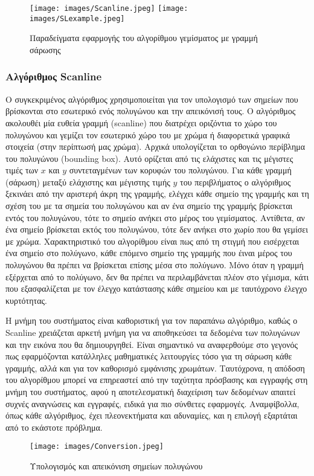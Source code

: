 \vspace{3em}
\begin{figure}[h]
\centering
\texttt{[image: images/Scanline.jpeg]}
\texttt{[image: images/SLexample.jpeg]}
\caption{Παραδείγματα εφαρμογής του αλγορίθμου γεμίσματος με γραμμή σάρωσης}
\end{figure}

\subsubsection{Αλγόριθμος \textlatin{Scanline}}

Ο συγκεκριμένος αλγόριθμος χρησιμοποιείται για τον υπολογισμό των σημείων που βρίσκονται στο εσωτερικό ενός πολυγώνου και την απεικόνισή τους. Ο αλγόριθμος ακολουθέι μία ευθεία γραμμή \textlatin{(scanline)} που διατρέχει οριζόντια το χώρο του πολυγώνου και γεμίζει τον εσωτερικό χώρο του με χρώμα ή διαφορετικά γραφικά στοιχεία (στην περίπτωσή μας χρώμα). Αρχικά υπολογίζεται το ορθογώνιο περίβλημα του πολυγώνου \textlatin{(bounding box)}. Αυτό ορίζεται από τις ελάχιστες και τις μέγιστες τιμές των $x$ και $y$ συντεταγμένων των κορυφών του πολυγώνου. Για κάθε γραμμή (σάρωση) μεταξύ ελάχιστης και μέγιστης τιμής $y$ του περιβλήματος ο αλγόριθμος ξεκινάει από την αριστερή άκρη της γραμμής, ελέγχει κάθε σημείο της γραμμής και τη σχέση του με τα σημεία του πολυγώνου και αν ένα σημείο της γραμμής βρίσκεται εντός του πολυγώνου, τότε το σημείο ανήκει στο μέρος του γεμίσματος. Αντίθετα, αν ένα σημείο βρίσκεται εκτός του πολυγώνου, τότε δεν ανήκει στο χωρίο που θα γεμίσει με χρώμα. Χαρακτηριστικό του αλγορίθμου είναι πως από τη στιγμή που εισέρχεται ένα σημείο στο πολύγωνο, κάθε επόμενο σημείο της γραμμής που έιναι μέρος του πολυγώνου θα πρέπει να βρίσκεται επίσης μέσα στο πολύγωνο. Μόνο όταν η γραμμή εξέρχεται από το πολύγωνο, δεν θα πρέπει να περιλαμβάνεται πλέον στο γέμισμα, κάτι που εξασφαλίζεται με τον έλεγχο κατάστασης κάθε σημείου και με ταυτόχρονο έλεγχο κυρτότητας. 
\par

Η μνήμη του συστήματος είναι καθοριστική για τον παραπάνω αλγόριθμο, καθώς ο \textlatin{Scanline} χρειάζεται αρκετή μνήμη για να αποθηκεύσει τα δεδομένα των πολυγώνων και την εικόνα που θα δημιουργηθεί. Είναι σημαντικό να αναφερθούμε στο γεγονός πως εφαρμόζονται κατάλληλες μαθηματικές λειτουργίες τόσο για τη σάρωση κάθε γραμμής, αλλά και για τον καθορισμό εμφάνισης χρωμάτων. Ταυτόχρονα, η απόδοση του αλγορίθμου μπορεί να επηρεαστεί από την ταχύτητα πρόσβασης και εγγραφής στη μνήμη του συστήματος, αφού η αποτελεσματική διαχείριση των δεδομένων απαιτεί συχνές αναγνώσεις και εγγραφές, ειδικά για πιο σύνθετες εφαρμογές. Αναμφίβολλα, όπως κάθε αλγόριθμος, έχει πλεονεκτήματα και αδυναμίες, και η επιλογή εξαρτάται από το εκάστοτε πρόβλημα.

\vspace{3em}
\begin{figure}[h]
\centering
\texttt{[image: images/Conversion.jpeg]}
\caption{Υπολογισμός και απεικόνιση σημείων πολυγώνου}
\end{figure}

\pagebreak